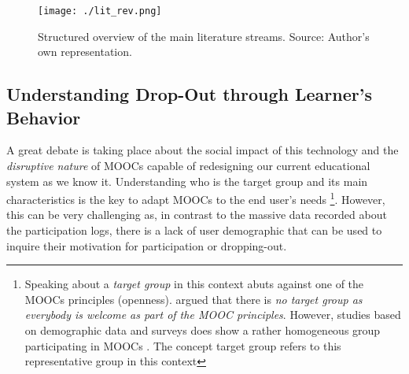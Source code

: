 \documentclass[
	a4paper,
	pdftex,
	12pt,	
	footinclude=true,
	fleqn,
	final,
	]{report}%
\begin{document}
\begin{figure}[h]
 \centering
 \texttt{[image: ./lit\_rev.png]}
 \caption[Literature main research streams]{Structured overview of the main literature streams. Source: Author's own representation.} %
 \label{fig:3}
\end{figure}

\vspace{-0.45cm}
\subsection[Investigating Learner's Behavior]{Understanding Drop-Out through Learner's Behavior}%
\label{subs:mooc_participants}
\vspace{-0.3cm}

A great debate is taking place about the social impact of this technology and the \emph{disruptive 
nature} of MOOCs \cite{Russell2013} capable of redesigning our current educational system as we know it.
Understanding who is the target group and its main characteristics is the key to adapt MOOCs to the end user's needs
\footnote{Speaking about a \emph{target group} in this context abuts against one of the MOOCs principles (openness).
\cite{Creelman2013} argued that there is \emph{no target group as everybody is welcome as part of the MOOC principles}.
However, studies based on demographic data \cite{Ho2013,Ho2015a} and surveys\cite{Christensen2013,Conole2013} 
does show a rather homogeneous group participating in MOOCs \cite{Russell2013}. 
The concept target group refers to this representative group in this context}. However, this can be very challenging as, in contrast to the massive 
data recorded about the participation logs, there is a lack of user demographic \cite{Hansen2015} 
that can be used to inquire their motivation for participation or dropping-out.
\end{document}
